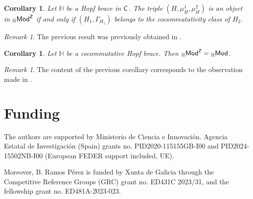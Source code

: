 \documentclass[11pt,reqno]{amsart}
\theoremstyle{plain}%
\newtheorem{corollary}[theorem]{Corollary}%
\theoremstyle{definition}
\theoremstyle{remark}
\newtheorem{remark}[theorem]{Remark}
\begin{document}
\begin{corollary} 
	\label{firstH}
	Let ${\mathbb H}$ be a Hopf brace in ${\sf C}$. The triple $(H,\mu_{H}^{1},\mu_{H}^{2})$  is an object in ${}_{\mathbb{H}}{\sf Mod}^{{\sf Z}}$ if and only if $(H_{1},\Gamma_{H_{1}})$ belongs to the cocommutativity class of $H_{2}$.
\end{corollary}
\begin{remark}
	The previous result was previously obtained in \cite[Remark 2.9]{VGRRProj}.
\end{remark}

\begin{corollary}
	\label{firstMH1}
	Let ${\mathbb H}$ be a cocommutative Hopf brace. Then  ${}_{\mathbb{H}}{\sf Mod}^{{\sf Z}}={}_{\mathbb{H}}{\sf Mod}$.
\end{corollary}
\begin{remark}
	The content of the previous corollary corresponds to the observation made in \cite[Remark 2.1]{RGON}.
\end{remark}

\section*{Funding}

The  authors are supported by  Ministerio de Ciencia e Innovaci\'on. Agencia Estatal de Investigaci\'on (Spain) grants no. PID2020-115155GB-I00 and PID2024-15502NB-I00 (European FEDER support included, UE).

Moreover, B. Ramos Pérez is funded by Xunta de Galicia through the Competitive Reference Groups (GRC) grant no. ED431C 2023/31,  and the fellowship grant no. ED481A-2023-023.


%	
%	
%	
%	
\end{document}
